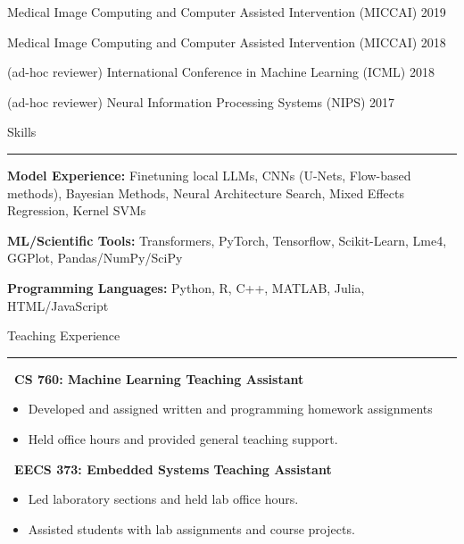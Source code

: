 \documentclass[]{article}
\begin{document}
\noindent Medical Image Computing and Computer Assisted Intervention (MICCAI) \hfill 2019

\noindent Medical Image Computing and Computer Assisted Intervention (MICCAI) \hfill 2018

\noindent (ad-hoc reviewer) International Conference in Machine Learning (ICML) \hfill 2018

\noindent (ad-hoc reviewer) Neural Information Processing Systems (NIPS) \hfill 2017
\fi

\vspace{10pt}
{\LARGE Skills}
\vspace{5pt}
\hrule
\vspace{10pt}

\noindent \textbf{Model Experience:} Finetuning local LLMs, CNNs (U-Nets, Flow-based methods), Bayesian Methods, Neural Architecture Search, Mixed Effects Regression,
Kernel SVMs

\noindent \textbf{ML/Scientific Tools:} Transformers, PyTorch, Tensorflow, Scikit-Learn, Lme4, GGPlot, Pandas/NumPy/SciPy

\noindent \textbf{Programming Languages:} Python, R, C++, MATLAB, Julia, HTML/JavaScript


\iffalse
\vspace{5pt}
{\LARGE Teaching Experience}
\vspace{3pt}
\hrule
\vspace{5pt}

 \newline
	{\bf \ CS 760: Machine Learning Teaching Assistant}
	\begin{itemize}[label={$\bullet$}]
		\item Developed and assigned written and programming homework assignments
		\item Held office hours and provided general teaching support.
	\end{itemize} 

 \newline
	{\bf \ EECS 373: Embedded Systems Teaching Assistant}
	\begin{itemize}[label={$\bullet$}]
		\item Led laboratory sections and held lab office hours.
		\item Assisted students with lab assignments and course projects.
	\end{itemize}
\end{document}
